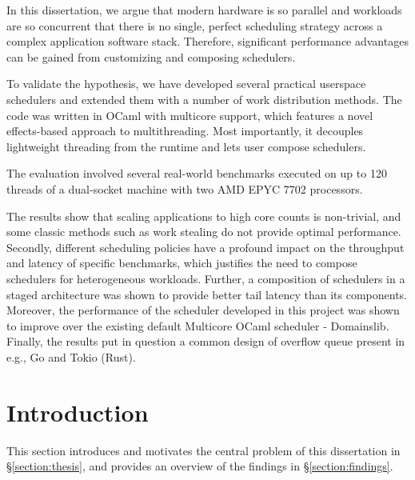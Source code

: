 \documentclass[12pt,a4paper,twoside]{report}
\begin{document}
In this dissertation, we argue that modern hardware is so parallel and workloads are so concurrent that there is no single, perfect scheduling strategy across a complex application software stack. Therefore, significant performance advantages can be gained from customizing and composing schedulers.

To validate the hypothesis, we have developed several practical userspace schedulers and extended them with a number of work distribution methods. The code was written in OCaml with multicore support, which features a novel effects-based approach to multithreading. Most importantly, it decouples lightweight threading from the runtime and lets user compose schedulers. 

The evaluation involved several real-world benchmarks executed on up to 120 threads of a dual-socket machine with two AMD EPYC 7702 processors.

The results show that scaling applications to high core counts is non-trivial, and some classic methods such as work stealing do not provide optimal performance. Secondly, different scheduling policies have a profound impact on the throughput and latency of specific benchmarks, which justifies the need to compose schedulers for heterogeneous workloads. Further, a composition of schedulers in a staged architecture was shown to provide better tail latency than its components. Moreover, the performance of the scheduler developed in this project was shown to improve over the existing default Multicore OCaml scheduler - Domainslib. Finally, the results put in question a common design of overflow queue present in e.g., Go and Tokio (Rust).

\tableofcontents

\chapter{Introduction}

\label{firstcontentpage} %

\label{section:introduction}
This section introduces and motivates the central problem of this dissertation in \S\ref{section:thesis}, and provides an overview of the findings in \S\ref{section:findings}.  
\end{document}
